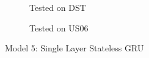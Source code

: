 \begin{figure}[htbp]
    \hfill
    \begin{subfigure}[b]{0.325\textwidth}
        \centering
        
        \caption{Tested on DST}
    \end{subfigure}
    \hfill
    \begin{subfigure}[b]{0.325\textwidth}
        \centering
        
        \caption{Tested on US06}
    \end{subfigure}
    \caption{Model 5: Single Layer Stateless GRU}
    \label{fig:Model-5res}
\end{figure}
